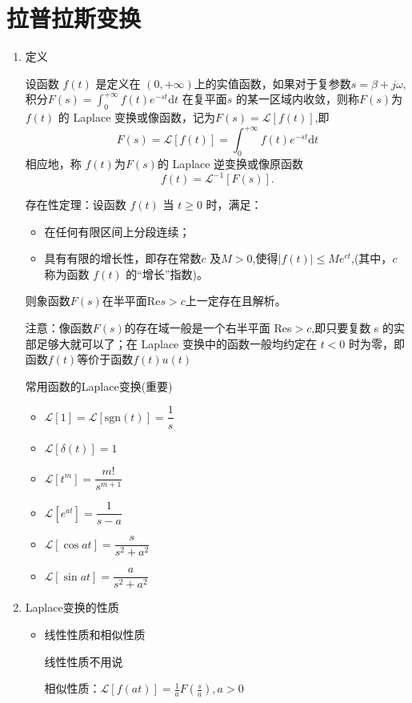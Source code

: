 \documentclass[a4paper,11pt,UTF8]{article}
\begin{document}
\section{拉普拉斯变换}
\begin{enumerate}
	\item 定义
	
	设函数 $f(t)$ 是定义在 $(0,+\infty)$上的实值函数，如果对于复参数$s=\beta+j\omega$,积分$F( s) = \int _0^{+ \infty}f( t) e^{- st}$d$t$ 在复平面$s$ 的某一区域内收敛，则称$F(s)$为$f(t)$ 的 Laplace 变换或像函数，记为$F(s)=\mathcal{L}[f(t)]$,即
	$$
	F(s)=\mathcal{L}[f(t)]=\int_{0}^{+\infty}f(t)e^{-st}\mathrm{d}t
	$$
	相应地，称 $f(t)$为$F(s)$的 Laplace 逆变换或像原函数
	$$
	f(t)=\mathcal{L}^{-1}[F(s)].
	$$
	
	存在性定理：设函数 $f(t)$ 当 $t\geq0$ 时，满足：
	\begin{itemize}
		\item 在任何有限区间上分段连续； 
		
		\item 具有有限的增长性，即存在常数$c$ 及$M>0$,使得$|f(t)|\leq M{e}^{ct}$,(其中，$c$ 称为函数 $f(t)$ 的“增长”指数)。
	\end{itemize}
	则象函数$F(s)$在半平面$\mathrm{Re} s>c$上一定存在且解析。
	
	注意：像函数$F(s)$的存在域一般是一个右半平面 Res$>c$,即只要复数 s 的实部足够大就可以了；在 Laplace 变换中的函数一般均约定在 $t<0$ 时为零，即函数$f(t)$等价于函数$f(t){u}(t)$
	
	常用函数的Laplace变换(重要)
	\begin{itemize}
		\item $\mathcal{L}[1]=\mathcal{L}[{\mathrm{sgn}(t)}]=\dfrac1s$
		\item $\mathcal{L}[\delta(t)]=1$
		\item $\mathcal{L}[t^m]=\dfrac{m!}{s^{m+1}}$
		\item $\mathcal{L}[e^{at}]=\dfrac1{s-a}$
		\item $\mathcal{L}[\cos at]=\dfrac{s}{s^2+a^2}$
		\item $\mathcal{L}[\sin at]=\dfrac{a}{s^2+a^2}$ 
	\end{itemize}
	\item Laplace变换的性质
	\begin{itemize}
		\item 线性性质和相似性质
		
		线性性质不用说
		
		相似性质：$\mathcal{L}[f(at)]=\frac1aF(\frac{s}{a}),a>0$
		

\end{itemize}
\end{enumerate}
\end{document}
